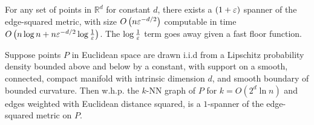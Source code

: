 
\begin{theorem} \label{thm:general-spanner}
  For any set of points in $\mathbb{R}^d$ for constant $d$, there exists a $(1+\varepsilon)$
  spanner of the edge-squared metric, 
  with size $O\left(n\varepsilon^{-d/2} \right)$ computable in time
  $O\left(n \log n + n\varepsilon^{-d/2}\log{\frac{1}{\varepsilon}}\right)$. The
  $\log{\frac{1}{\varepsilon}}$ term goes away given a fast floor function.
\end{theorem}

\begin{theorem} \label{thm:distribution-spanner}
Suppose points $P$ in Euclidean space are drawn i.i.d from a Lipschitz probability density bounded
above and below by a constant, with support on a
smooth, connected, compact manifold with intrinsic dimension $d$,
  and smooth
  boundary of bounded curvature. Then w.h.p. the $k$-NN graph of
  $P$ for $k = O(2^d \ln n)$ and edges weighted with Euclidean
  distance squared, is a $1$-spanner of the edge-squared
  metric on $P$.
\end{theorem}

